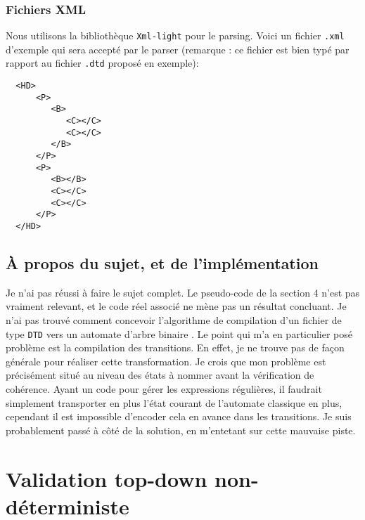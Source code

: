 \documentclass[twoside,12pt]{article}
\begin{document}
\subsubsection{Fichiers XML}

Nous utilisons la bibliothèque \texttt{Xml-light} pour le parsing.
Voici un fichier \texttt{.xml} d'exemple qui sera accepté par le parser (remarque :
ce fichier est bien typé par rapport au fichier \texttt{.dtd} proposé en exemple):
  \begin{verbatim}
  <HD>
      <P>
         <B>
            <C></C>
            <C></C>
         </B>
      </P>
      <P>
         <B></B>
         <C></C>
         <C></C>
      </P>
  </HD>
  \end{verbatim}

\subsection{À propos du sujet, et de l'implémentation}

Je n'ai pas réussi à faire le sujet complet.
Le pseudo-code de la section 4 n'est pas vraiment relevant, et
le code réel associé ne mène pas un résultat concluant.
Je n'ai pas trouvé comment concevoir l'algorithme de
compilation d'un fichier de type \texttt{DTD} vers un automate
d'arbre binaire \footnotemark. Le point qui m'a en particulier posé
problème est la compilation des transitions. En effet, je ne trouve
pas de façon générale pour réaliser cette transformation. Je crois
que mon problème est précisément situé au niveau des états à nommer
avant la vérification de cohérence. Ayant un code pour gérer les
expressions régulières, il faudrait \og simplement \fg{} transporter
en plus l'état courant de l'automate classique en plus, cependant
il est impossible d'encoder cela en avance dans les transitions.
Je suis probablement passé à côté de la solution, en m'entetant sur
cette mauvaise piste.



\section{Validation top-down non-déterministe}
\end{document}
